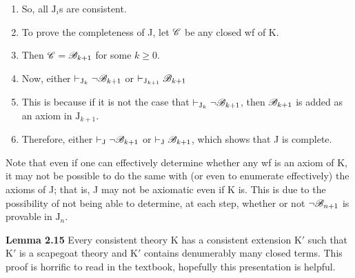 \begin{enumerate}
\begin{enumerate} [label = \roman*.]
    \end{enumerate}
    \item So, all $\text{J}_i$s are consistent.
    \item To prove the completeness of J, let $\mathscr{C}$ be any closed wf of K.
    \item Then $\mathscr{C}=\mathscr{B}_{k+1}$ for some $k\geq 0$.
    \item Now, either $\vdash_{\text{J}_k} \lnot \mathscr{B}_{k+1}$ or $\vdash_{\text{J}_{k+1}} \mathscr{B}_{k+1}$
    \item This is because if it is not the case that $\vdash_{\text{J}_k} \lnot \mathscr{B}_{k+1}$, then $\mathscr{B}_{k+1}$ is added as an axiom in $\text{J}_{k+1}$.
    \item Therefore, either $\vdash_{\text{J}} \lnot \mathscr{B}_{k+1}$ or $\vdash_{\text{J}} \mathscr{B}_{k+1}$, which shows that J is complete.
\end{enumerate}

Note that even if one can effectively determine whether any wf is an axiom of K, it may not be possible to do the same with (or even to enumerate effectively) the axioms of J; that is, J may not be axiomatic even if K is. This is due to the possibility of not being able to determine, at each step, whether or not $\lnot \mathscr{B}_{n+1}$ is provable in $\text{J}_n$.

\textbf{Lemma 2.15}
Every consistent theory K has a consistent extension K$'$ such that K$'$ is a scapegoat theory and K$'$ contains denumerably many closed terms. This proof is horrific to read in the textbook, hopefully this presentation is helpful.

